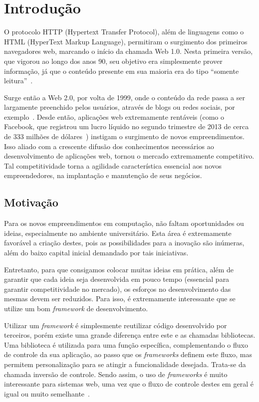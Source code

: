 \chapter{Introdução}

O protocolo HTTP (Hypertext Transfer Protocol),
além de linguagens como o HTML (HyperText Markup Language),
permitiram o surgimento dos primeiros navegadores web, marcando o início da chamada Web 1.0. Nesta primeira versão, que vigorou ao longo dos anos 90, seu objetivo era simplesmente prover informação, já que o conteúdo presente em sua maioria era do tipo ``somente leitura''~\cite{slidesweb}.

Surge então a Web 2.0, por volta de 1999, onde o conteúdo da rede passa a ser largamente preenchido pelos usuários, através de blogs ou redes sociais, por exemplo~\cite{videoweb}. Desde então, aplicações web extremamente rentáveis (como o Facebook, que registrou um lucro líquido no segundo trimestre de 2013 de cerca de 333 milhões de dólares~\cite{facebooklucro}) instigam o surgimento de novos empreendimentos. Isso aliado com a crescente difusão dos conhecimentos necessários ao desenvolvimento de aplicações web, tornou o mercado extremamente competitivo. Tal competitividade torna a agilidade característica essencial aos novos empreendedores, na implantação e manutenção de seus negócios.

\section{Motivação}

Para os novos empreendimentos em computação, não faltam oportunidades ou ideias, especialmente no ambiente universitário.  Esta área é extremamente favorável a criação destes, pois as possibilidades para a inovação são inúmeras, além do baixo capital inicial demandado por tais iniciativas.

Entretanto, para que consigamos colocar muitas ideias em prática, além de garantir que cada ideia seja desenvolvida em pouco tempo (essencial para garantir competitividade no mercado), os esforços no desenvolvimento das mesmas devem ser reduzidos. Para isso, é extremamente interessante que se utilize um bom \textit{framework} de desenvolvimento.

Utilizar um \textit{framework} é simplesmente reutilizar código desenvolvido por terceiros, porém existe uma grande diferença entre este e as chamadas bibliotecas. Uma biblioteca é utilizada para uma função específica, complementando o fluxo de controle da sua aplicação, ao passo que os \textit{frameworks} definem este fluxo, mas permitem personalização para se atingir a funcionalidade desejada. Trata-se da chamada inversão de controle. Sendo assim, o uso de \textit{frameworks} é muito interessante para sistemas web, uma vez que o fluxo de controle destes em geral é igual ou muito semelhante~\cite{wikipediaframework}.

